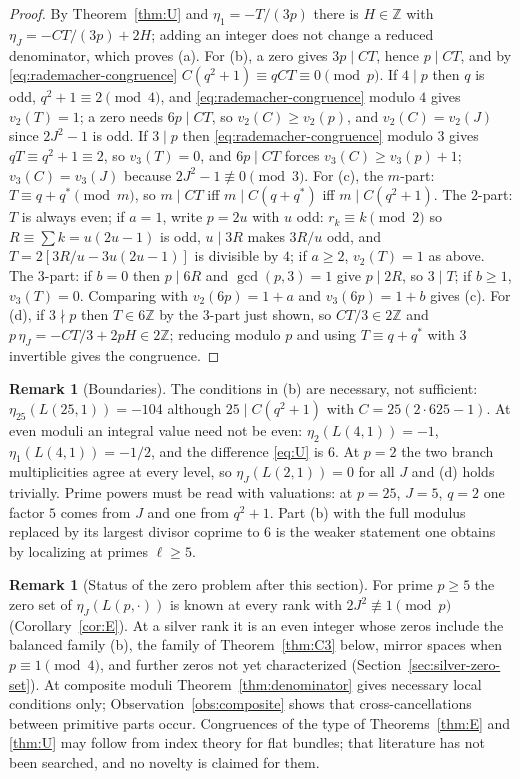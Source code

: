 \documentclass[11pt]{article}
\theoremstyle{definition}
\newtheorem{remark}[theorem]{Remark}
\newcommand{\Z}{\mathbb Z}
\begin{document}
\begin{proof}
By Theorem~\ref{thm:U} and $\eta_1=-T/(3p)$ there is $H\in\Z$ with
$\eta_J=-CT/(3p)+2H$; adding an integer does not change a reduced
denominator, which proves (a).  For (b), a zero gives $3p\mid CT$, hence
$p\mid CT$, and by \eqref{eq:rademacher-congruence}
$C(q^2+1)\equiv qCT\equiv0\pmod p$.  If $4\mid p$ then $q$ is odd,
$q^2+1\equiv2\pmod4$, and \eqref{eq:rademacher-congruence} modulo $4$
gives $v_2(T)=1$; a zero needs $6p\mid CT$, so $v_2(C)\geq v_2(p)$, and
$v_2(C)=v_2(J)$ since $2J^2-1$ is odd.  If $3\mid p$ then
\eqref{eq:rademacher-congruence} modulo $3$ gives $qT\equiv q^2+1\equiv2$,
so $v_3(T)=0$, and $6p\mid CT$ forces $v_3(C)\geq v_3(p)+1$;
$v_3(C)=v_3(J)$ because $2J^2-1\not\equiv0\pmod3$.  For (c), the
$m$-part: $T\equiv q+q^*\pmod m$, so $m\mid CT$ iff $m\mid C(q+q^*)$ iff
$m\mid C(q^2+1)$.  The $2$-part: $T$ is always even; if $a=1$, write
$p=2u$ with $u$ odd: $r_k\equiv k\pmod2$ so $R\equiv\sum k=u(2u-1)$ is
odd, $u\mid3R$ makes $3R/u$ odd, and
$T=2[3R/u-3u(2u-1)]$ is divisible by $4$; if $a\geq2$, $v_2(T)=1$ as
above.  The $3$-part: if $b=0$ then $p\mid6R$ and $\gcd(p,3)=1$ give
$p\mid2R$, so $3\mid T$; if $b\geq1$, $v_3(T)=0$.  Comparing with
$v_2(6p)=1+a$ and $v_3(6p)=1+b$ gives (c).  For (d), if $3\nmid p$ then
$T\in6\Z$ by the $3$-part just shown, so $CT/3\in2\Z$ and
$p\,\eta_J=-CT/3+2pH\in2\Z$; reducing modulo $p$ and using
$T\equiv q+q^*$ with $3$ invertible gives the congruence.
\end{proof}

\begin{remark}[Boundaries]
\label{rem:U-boundaries}
The conditions in (b) are necessary, not sufficient:
$\eta_{25}(L(25,1))=-104$ although $25\mid C(q^2+1)$ with
$C=25(2\cdot625-1)$.  At even moduli an integral value need not be
even: $\eta_2(L(4,1))=-1$, $\eta_1(L(4,1))=-1/2$, and the difference
\eqref{eq:U} is $6$.  At $p=2$ the two branch multiplicities agree at
every level, so $\eta_J(L(2,1))=0$ for all $J$ and (d) holds trivially.
Prime powers must be read with valuations: at $p=25$, $J=5$, $q=2$ one
factor $5$ comes from $J$ and one from $q^2+1$.  Part (b) with the full
modulus replaced by its largest divisor coprime to $6$ is the weaker
statement one obtains by localizing at primes $\ell\geq5$.
\end{remark}

\begin{remark}[Status of the zero problem after this section]
\label{rem:zero-status}
For prime $p\geq5$ the zero set of $\eta_J(L(p,\cdot))$ is known at every
rank with $2J^2\not\equiv1\pmod p$ (Corollary~\ref{cor:E}).  At a silver
rank it is an even integer whose zeros include the balanced family (b),
the family of Theorem~\ref{thm:C3} below, mirror spaces when
$p\equiv1\pmod4$, and further zeros not yet characterized
(Section~\ref{sec:silver-zero-set}).  At composite moduli
Theorem~\ref{thm:denominator} gives necessary local conditions only;
Observation~\ref{obs:composite} shows that cross-cancellations between
primitive parts occur.  Congruences of the type of
Theorems~\ref{thm:E} and \ref{thm:U} may follow from index theory for
flat bundles; that literature has not been searched, and no novelty is
claimed for them.
\end{remark}
\end{document}
